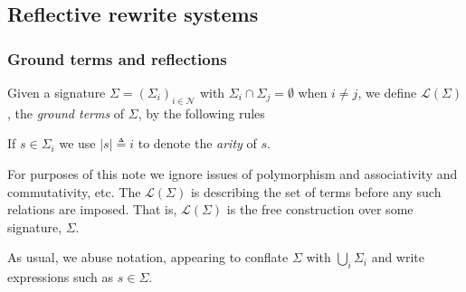 \subsection{Reflective rewrite systems}\label{sub:the_syntax_and_semantics_of_the_notation_system} %



\subsubsection{Ground terms and reflections}

\begin{definition}
  Given a signature $\Sigma = (\Sigma_{i})_{i \in \mathcal{N}}$ with
  $\Sigma_i \cap \Sigma_j = \emptyset$ when $i \neq j$, we define
  $\mathcal{L}(\Sigma)$, the \emph{ground terms} of $\Sigma$, by the
  following rules


  If $s \in \Sigma_i$ we use $|s| \triangleq i$ to denote the
  \emph{arity} of $s$.
\end{definition}

\begin{remark}
  For purposes of this note we ignore issues of polymorphism and
  associativity and commutativity, etc. The $\mathcal{L}(\Sigma)$ is
  describing the set of terms before any such relations are
  imposed. That is, $\mathcal{L}(\Sigma)$ is the free construction
  over some signature, $\Sigma$.
\end{remark}

\begin{remark}
  As usual, we abuse notation, appearing to conflate $\Sigma$ with
  $\bigcup_i\Sigma_i$ and write expressions such as $s \in \Sigma$.
\end{remark}

